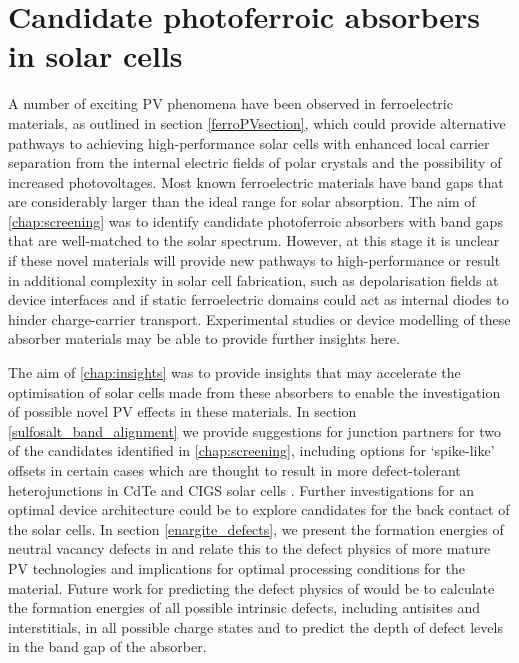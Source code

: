 \documentclass[11pt, twoside]{report}
\begin{document}
\section{Candidate photoferroic absorbers in solar cells}
A number of exciting PV phenomena have been observed in ferroelectric materials, as outlined in section \ref{ferroPVsection}, which could provide alternative pathways to achieving high-performance solar cells with enhanced local carrier separation from the internal electric fields of polar crystals and the possibility of increased photovoltages. Most known ferroelectric materials have band gaps that are considerably larger than the ideal range for solar absorption. The aim of \autoref{chap:screening} was to identify candidate photoferroic absorbers with band gaps that are well-matched to the solar spectrum.
However, at this stage it is unclear if these novel materials will provide new pathways to high-performance or result in additional complexity in solar cell fabrication, such as depolarisation fields at device interfaces \cite{FE-PV_kirchartz} and if static ferroelectric domains could act as internal diodes to hinder charge-carrier transport. Experimental studies or device modelling of these absorber materials may be able to provide further insights here.

The aim of \autoref{chap:insights} was to provide insights that may accelerate the optimisation of solar cells made from these absorbers to enable the investigation of possible novel PV effects in these materials. In section \ref{sulfosalt_band_alignment} we provide suggestions for junction partners for two of the candidates identified in \autoref{chap:screening}, including options for `spike-like' offsets in certain cases which are thought to result in more defect-tolerant heterojunctions in CdTe and CIGS solar cells \cite{CdTe_spike, p-type_spike}. Further investigations for an optimal device architecture could be to explore candidates for the back contact of the solar cells.
In section \ref{enargite_defects}, we present the formation energies of neutral vacancy defects in {\enargite} and relate this to the defect physics of more mature PV technologies and implications for optimal processing conditions for the material. Future work for predicting the defect physics of {\enargite} would be to calculate the formation energies of all possible intrinsic defects, including antisites and interstitials, in all possible charge states and to predict the depth of defect levels in the band gap of the absorber.
\end{document}
